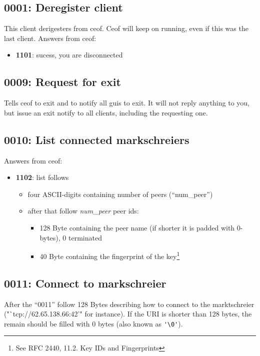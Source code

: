 \documentclass[12pt,a4paper]{article}
\begin{document}
\subsection{0001: Deregister client}
This client derigesters from ceof. Ceof will keep on running, even if this
was the last client.
Answers from ceof:
\begin{itemize}
\item \textbf{1101}: sucess, you are disconnected
\end{itemize}
\subsection{0009: Request for exit}
Tells ceof to exit and to notify all guis to exit.
It will not reply anything to you, but issue an exit notify to all clients,
including the requesting one.
\subsection{0010: List connected markschreiers}
Answers from ceof:
\begin{itemize}
\item \textbf{1102}: list follows
\begin{itemize}
\item four ASCII-digits containing number of peers ("`num\_peer"')
\item after that follow \textit{num\_peer} peer ids:
\begin{itemize}
\item 128 Byte containing the peer name (if shorter it is padded with 0-bytes), 0 terminated
\item 40 Byte containing the fingerprint of the
key\footnote{See RFC 2440, 11.2. Key IDs and Fingerprints}
\end{itemize}
\end{itemize}
\end{itemize}
\subsection{0011: Connect to markschreier}
After the "`0011"' follow 128 Bytes describing how to connect
to the marktschreier ("`tcp://62.65.138.66:42'" for instance).
If the URI is shorter than 128 bytes, the remain should be filled with 0 bytes
(also known as \verb='\0'=).
\end{document}
